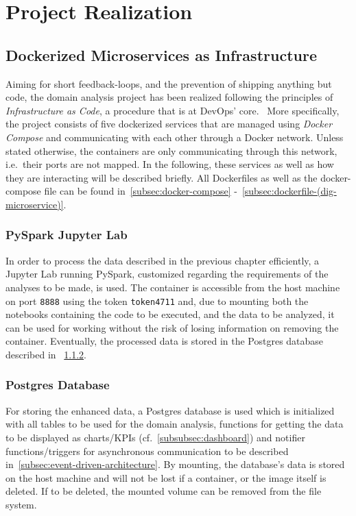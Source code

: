 \section{Project Realization}\label{sec:project-realization}

\subsection{Dockerized Microservices as Infrastructure}\label{subsec:dockerized-microservices-as-infrastructure}

Aiming for short feedback-loops, and the prevention of shipping anything but code, the domain analysis project has been realized following the principles of \textit{Infrastructure as Code}, a procedure that is at DevOps' core.~\autocite[cf.][p. 13]{Riti.2018}
More specifically, the project consists of five dockerized services that are
managed using \textit{Docker Compose} and communicating with each other through a Docker network.
Unless stated otherwise, the containers are only communicating through this network, i.e.\ their ports are not mapped.
In the following, these services as well as how they are interacting will be described briefly.
All Dockerfiles as well as the docker-compose file can be found in~\ref{subsec:docker-compose} -~\ref{subsec:dockerfile-(dig-microservice)}.

\subsubsection{PySpark Jupyter Lab}\label{subsubsec:pyspark-jupyter-lab}

In order to process the data described in the previous chapter efficiently, a Jupyter Lab running PySpark, customized regarding the requirements of the analyses to be made, is used.
The container is accessible from the host machine on port \texttt{8888} using the token \texttt{token4711} and, due to mounting both the notebooks containing the code to be executed,
and the data to be analyzed, it can be used for working without the risk of losing information on removing the container.
Eventually, the processed data is stored in the Postgres database described in ~\ref{subsubsec:postgres-database}.
%

\subsubsection{Postgres Database}\label{subsubsec:postgres-database}

For storing the enhanced data, a Postgres database is used which is initialized with all tables to be used for the domain analysis, functions for getting the data to be displayed as charts/KPIs (cf.~\ref{subsubsec:dashboard})
and notifier functions/triggers for asynchronous communication to be described in~\ref{subsec:event-driven-architecture}.
By mounting, the database's data is stored on the host machine and will not be lost if a container, or the image itself is deleted.
If to be deleted, the mounted volume can be removed from the file system.

